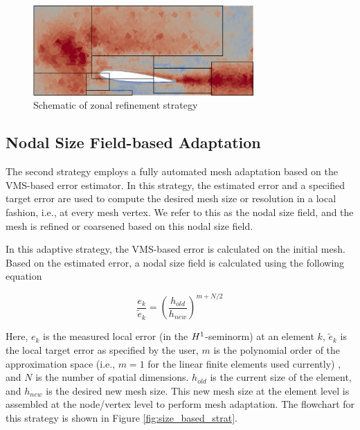 \begin{figure}[H]
	\centering
	\includegraphics[width=0.75\textwidth]{figures/adapt_strat/zonal_based_schematic.png}
	\caption{Schematic of zonal refinement strategy}
	\label{fig:zonal_based_strat_schematic}
\end{figure}

\subsection{Nodal Size Field-based Adaptation}
\label{sec:sf_adapt}

The second strategy employs a fully automated mesh adaptation based on the VMS-based error estimator. In this strategy, the estimated error and a specified target error are used to compute the desired mesh size or resolution in a local fashion, i.e., at every mesh vertex. We refer to this as the nodal size field, and the mesh is refined or coarsened based on this nodal size field. 

In this adaptive strategy, the VMS-based error is calculated on the initial mesh. Based on the estimated error, a nodal size field is calculated using the following equation \cite{zhang19}

\begin{equation}
	\frac{e_k}{\tilde{e}_k} = \left(\frac{h_{old}}{h_{new}}\right)^{m+N/2} 
	\label{eq:diez}
\end{equation}

Here, $e_k$ is the measured local error (in the $H^{1}$-seminorm) at an element $k$, $\tilde{e}_k$ is the local target error as specified by the user, $m$ is the polynomial order of the approximation space (i.e., $m=1$ for the linear finite elements used currently) , and $N$ is the number of spatial dimensions. $h_{old}$ is the current size of the element, and $h_{new}$ is the desired new mesh size.
This new mesh size at the element level is assembled at the node/vertex level to perform mesh adaptation.
The flowchart for this strategy is shown in Figure \ref{fig:size_based_strat}.

